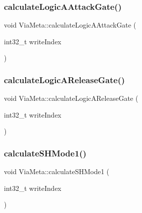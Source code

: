 \subsubsection{\texorpdfstring{calculate\+Logic\+A\+Attack\+Gate()}{calculateLogicAAttackGate()}}
{\footnotesize\ttfamily void Via\+Meta\+::calculate\+Logic\+A\+Attack\+Gate (\begin{DoxyParamCaption}\item[{int32\+\_\+t}]{write\+Index }\end{DoxyParamCaption})}

\mbox{\label{class_via_meta_adfca36bfdc46260efc6f6af088eb94c0}} 
\subsubsection{\texorpdfstring{calculate\+Logic\+A\+Release\+Gate()}{calculateLogicAReleaseGate()}}
{\footnotesize\ttfamily void Via\+Meta\+::calculate\+Logic\+A\+Release\+Gate (\begin{DoxyParamCaption}\item[{int32\+\_\+t}]{write\+Index }\end{DoxyParamCaption})}

\mbox{\label{class_via_meta_a694368607a40f8a924207599e7722f1b}} 
\subsubsection{\texorpdfstring{calculate\+S\+H\+Mode1()}{calculateSHMode1()}}
{\footnotesize\ttfamily void Via\+Meta\+::calculate\+S\+H\+Mode1 (\begin{DoxyParamCaption}\item[{int32\+\_\+t}]{write\+Index }\end{DoxyParamCaption})}

\mbox{\label{class_via_meta_ada3ace55b8b293141aba025e0f5dde74}} 
